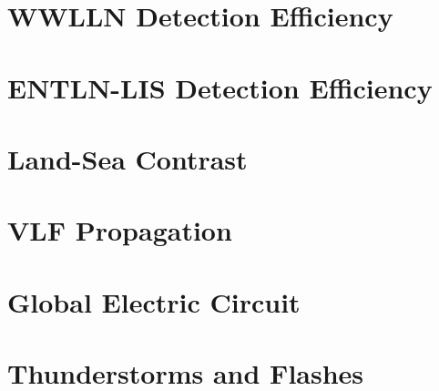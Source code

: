 \documentclass [11pt, twoside] {uwthesis}[2012/06/19]
\begin{document}



\chapter{WWLLN Detection Efficiency}
\label{thesis:chapter:efficiency}




\chapter{ENTLN-LIS Detection Efficiency}
\label{thesis:chapter:entln-lis}




\chapter{Land-Sea Contrast}
\label{thesis:chapter:landsea}




\chapter{VLF Propagation}
\label{thesis:chapter:prop}





\chapter{Global Electric Circuit}
\label{thesis:chapter:gec}




\chapter{Thunderstorms and Flashes}
\label{thesis:chapter:thunderstorm}



\end{document}
